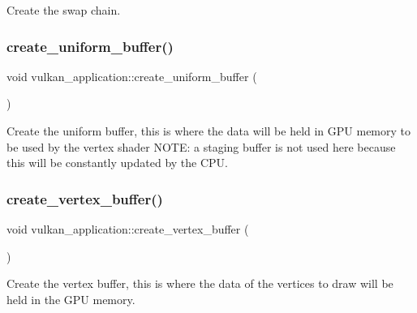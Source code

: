 Create the swap chain. 

\mbox{\label{classvulkan__application_a9be5f7de709b8b4d5521b9aad6c8dca8}} 
\subsubsection{\texorpdfstring{create\+\_\+uniform\+\_\+buffer()}{create\_uniform\_buffer()}}
{\footnotesize\ttfamily void vulkan\+\_\+application\+::create\+\_\+uniform\+\_\+buffer (\begin{DoxyParamCaption}{ }\end{DoxyParamCaption})\hspace{0.3cm}{\ttfamily [private]}}



Create the uniform buffer, this is where the data will be held in G\+PU memory to be used by the vertex shader N\+O\+TE\+: a staging buffer is not used here because this will be constantly updated by the C\+PU. 

\mbox{\label{classvulkan__application_ae4a77b3ff9b979777b6a81470c7c60d2}} 
\subsubsection{\texorpdfstring{create\+\_\+vertex\+\_\+buffer()}{create\_vertex\_buffer()}}
{\footnotesize\ttfamily void vulkan\+\_\+application\+::create\+\_\+vertex\+\_\+buffer (\begin{DoxyParamCaption}{ }\end{DoxyParamCaption})\hspace{0.3cm}{\ttfamily [private]}}



Create the vertex buffer, this is where the data of the vertices to draw will be held in the G\+PU memory. 

\mbox{\label{classvulkan__application_af2de4fec2329e96e5e0f020e6b4c3e02}} 
